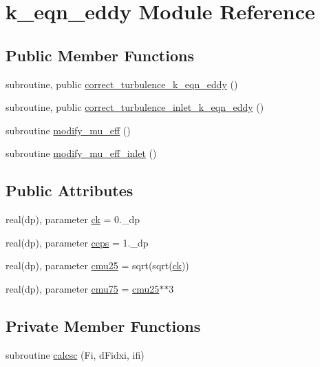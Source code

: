 \hypertarget{classk__eqn__eddy}{\section{k\-\_\-eqn\-\_\-eddy Module Reference}
\label{classk__eqn__eddy}
}
\subsection*{Public Member Functions}
\begin{DoxyCompactItemize}
\item 
subroutine, public \hyperlink{classk__eqn__eddy_a3f14479c8d34070706c89a9438de6ac1}{correct\-\_\-turbulence\-\_\-k\-\_\-eqn\-\_\-eddy} ()
\item 
subroutine, public \hyperlink{classk__eqn__eddy_ad5bb72a91afad8c4bf8ad7a1cbe1896c}{correct\-\_\-turbulence\-\_\-inlet\-\_\-k\-\_\-eqn\-\_\-eddy} ()
\item 
subroutine \hyperlink{classk__eqn__eddy_a4b5e12993193ded30a62136cd9637c4c}{modify\-\_\-mu\-\_\-eff} ()
\item 
subroutine \hyperlink{classk__eqn__eddy_a94c16ae63fa6f594c735d0b482ae9f27}{modify\-\_\-mu\-\_\-eff\-\_\-inlet} ()
\end{DoxyCompactItemize}
\subsection*{Public Attributes}
\begin{DoxyCompactItemize}
\item 
real(dp), parameter \hyperlink{classk__eqn__eddy_a65e5913ad8e939fa283e9608855a9031}{ck} = 0.\-\_\-dp
\item 
real(dp), parameter \hyperlink{classk__eqn__eddy_a4dd1902f2410d71ff09dac839034fe26}{ceps} = 1.\-\_\-dp
\item 
real(dp), parameter \hyperlink{classk__eqn__eddy_aa3cac83643e2f03b15da3e47e3fffeba}{cmu25} = sqrt(sqrt(\hyperlink{classk__eqn__eddy_a65e5913ad8e939fa283e9608855a9031}{ck}))
\item 
real(dp), parameter \hyperlink{classk__eqn__eddy_ac0518f6f4e948a91b594edd73676577a}{cmu75} = \hyperlink{classk__eqn__eddy_aa3cac83643e2f03b15da3e47e3fffeba}{cmu25}$\ast$$\ast$3
\end{DoxyCompactItemize}
\subsection*{Private Member Functions}
\begin{DoxyCompactItemize}
\item 
subroutine \hyperlink{classk__eqn__eddy_a1d234732469b29ce160b57c9b6f1fa47}{calcsc} (Fi, d\-Fidxi, ifi)
\end{DoxyCompactItemize}


